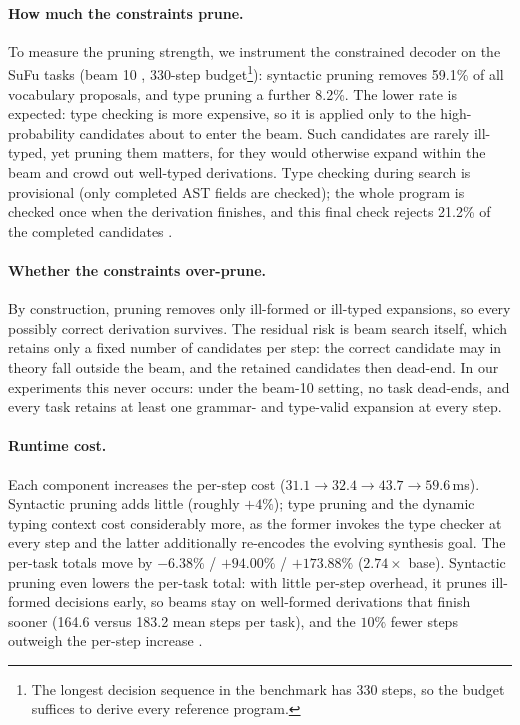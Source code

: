\documentclass[manuscript,screen]{acmart}
\begin{document}
\paragraph{{\color{revblue}How much the constraints prune.}}
{\color{revblue}To measure the pruning strength, we instrument the constrained decoder on the SuFu tasks (beam } 10  ,    {\color{revblue}330-step budget}\footnote{{\color{revblue}The longest decision sequence in the benchmark has 330 steps, so the budget suffices to derive every reference program.}}{\color{revblue}): syntactic pruning removes 59.1\% of all vocabulary proposals, and type pruning a further 8.2\%.
The lower rate is expected: type checking is more expensive, so it is applied only to the high-probability candidates about to enter the beam.
Such candidates are rarely ill-typed, yet pruning them matters, for they would otherwise expand within the beam and crowd out well-typed derivations.
Type checking during search is provisional (only completed AST fields are checked); the whole program is checked once when the derivation finishes, and this final check rejects 21.2\% of the completed candidates} .

   \paragraph{{\color{revblue}Whether the constraints over-prune.}}
{\color{revblue}By construction, pruning removes only ill-formed or ill-typed expansions, so every possibly correct derivation survives.
The residual risk is beam search itself, which retains only a fixed number of candidates per step: the correct candidate may in theory fall outside the beam, and the retained candidates then dead-end.
In our experiments this never occurs: under the beam-10 setting, no task dead-ends, and every task retains at least one grammar- and type-valid expansion at every step.
}


\paragraph{{\color{revblue}Runtime cost.}}
{\color{revblue}Each component increases the per-step cost ($31.1 \to 32.4 \to 43.7 \to 59.6$\,ms).
Syntactic pruning adds little (roughly $+4\%$); type pruning and the } dynamic typing context  \textbf{} %
  {\color{revblue}cost considerably more, as the former invokes the type checker at every step and the latter additionally re-encodes the evolving synthesis goal.
The per-task totals move by $-6.38\%$ / $+94.00\%$ / $+173.88\%$ ($2.74\times$ base).
Syntactic pruning even lowers the per-task total: with little per-step overhead, it prunes ill-formed decisions early, so beams stay on well-formed derivations that finish sooner (164.6 versus 183.2 mean steps per task), and the $10\%$ fewer steps outweigh the per-step increase} .
\end{document}
